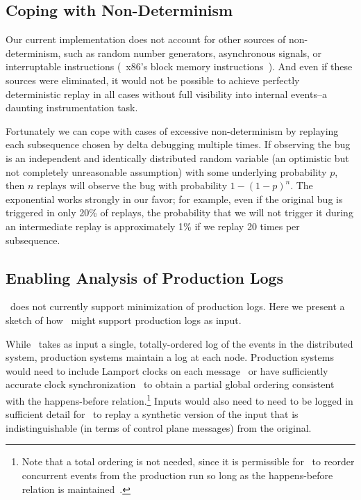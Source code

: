 \subsection{Coping with Non-Determinism}

Our current implementation does not account for other sources of non-determinism,
such as random number generators, asynchronous signals,
or interruptable instructions (\eg~x86's block memory
instructions~\cite{Dunlap:2002:REI:844128.844148}). And even if these sources were
eliminated, it would not be possible to achieve perfectly deterministic
replay in all cases without full visibility into internal events--a daunting
instrumentation task.

Fortunately we can cope with cases of excessive non-determinism by replaying each subsequence chosen
by delta debugging multiple times. If observing the bug
is an independent and identically distributed random variable (an optimistic
but not completely unreasonable assumption) with some
underlying probability $p$, then $n$
replays will observe the bug with probability $1-(1-p)^{n}$. The exponential
works strongly in our favor; for example, even if the original bug is
triggered in only 20\% of replays, the probability that we will not trigger
it during an intermediate replay is approximately
1\% if we replay 20 times per subsequence.

\subsection{Enabling Analysis of Production Logs}

\projectname~does not currently support minimization of production logs.
Here we present a sketch of how \projectname~might support production logs as input.

While \simulator~takes as input a single, totally-ordered log of the events in the
distributed system, production systems maintain a log at each node.
Production systems would need to include Lamport
clocks on each message~\cite{Lamport:1978:TCO:359545.359563} or have
sufficiently accurate clock
synchronization~\cite{corbett2012spanner} to obtain a partial global ordering
consistent with the happens-before relation.\footnote{
Note that a total ordering is not needed, since it is permissible
for \simulator~to reorder concurrent events from
the production run so long as the happens-before relation is
maintained~\cite{Fischer:1985:IDC:3149.214121}.}
Inputs would also need to need to be logged in sufficient detail for \projectname~to
replay a synthetic version of the input that is indistinguishable (in terms
of control plane messages) from the original.

